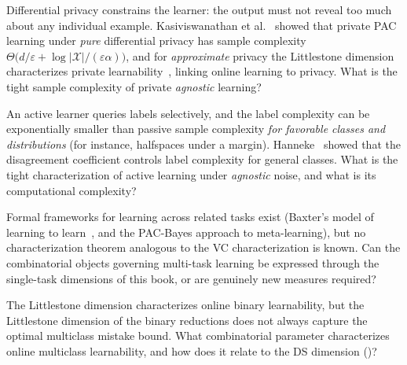 \begin{openprob}
\label{op:private}
Differential privacy constrains the learner: the output must not reveal too
much about any individual example.  Kasiviswanathan et
al.~\cite{KasiviswanathanLeeNissimRaskhodnikovaSmith2011} showed that private
PAC learning under \emph{pure} differential privacy has sample complexity
$\Theta\bigl(d/\varepsilon + \log|\mathcal{X}|/(\varepsilon\alpha)\bigr)$, and
for \emph{approximate} privacy the Littlestone dimension characterizes private
learnability~\cite{AlonLivniMalliarisMoran2019,BunLivniMoran2020}, linking
online learning to privacy.  What is the tight sample complexity of private
\emph{agnostic} learning?
\end{openprob}

\begin{openprob}
\label{op:active}
An active learner queries labels selectively, and the label complexity can be
exponentially smaller than passive sample complexity \emph{for favorable
classes and distributions} (for instance, halfspaces under a margin).
Hanneke~\cite{Hanneke2014} showed that the disagreement coefficient controls
label complexity for general classes.  What is the tight characterization of
active learning under \emph{agnostic} noise, and what is its computational
complexity?
\end{openprob}

\begin{openprob}
\label{op:meta}
Formal frameworks for learning across related tasks exist (Baxter's model of
learning to learn~\cite{Baxter2000}, and the PAC-Bayes approach to
meta-learning), but no characterization theorem analogous to the VC
characterization is known.  Can the combinatorial objects governing multi-task
learning be expressed through the single-task dimensions of this book, or are
genuinely new measures required?
\end{openprob}

\begin{openprob}
\label{op:online-multiclass-frontiers}
The Littlestone dimension characterizes online binary learnability, but the
Littlestone dimension of the binary reductions does not always capture the
optimal multiclass mistake bound.  What combinatorial parameter characterizes
online multiclass learnability, and how does it relate to the DS dimension
()?
\end{openprob}

